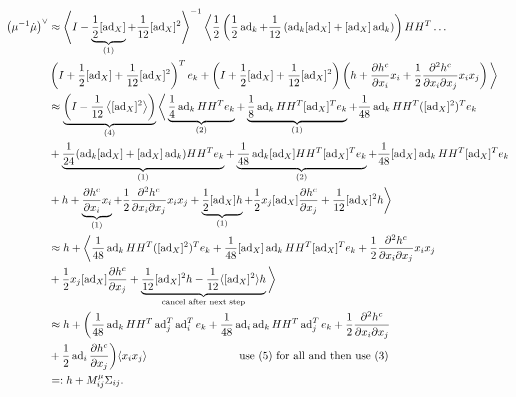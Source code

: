 \documentclass[12pt,class=article,crop=false]{standalone}
\begin{document}
\begin{align*}
	\left(\mu^{-1} \dot{\mu} \right)^\vee &\approx \left\langle I - \underbrace{\frac{1}{2} [\operatorname{ad}_X]}_{(1)} + \frac{1}{12} [\operatorname{ad}_X]^2 \right\rangle^{-1} \bigg\langle \frac{1}{2} \left( \frac{1}{2} \operatorname{ad}_{ k} + \frac{1}{12} \left( \operatorname{ad}_{ k} [ \operatorname{ad}_{ X}] + [ \operatorname{ad}_{ X}] \operatorname{ad}_{ k} \right)\right) HH^{T} \ldots \\
					      &\left( I + \frac{1}{2}[\operatorname{ad}_X] + \frac{1}{12}[\operatorname{ad}_X]^2 \right)^{T} e_k + \left( I + \frac{1}{2}[\operatorname{ad}_X] + \frac{1}{12}[\operatorname{ad}_X]^2 \right) \left( h + \frac{\partial h^{c}}{\partial x_i} x_i + \frac{1}{2} \frac{\partial^2 h^{c}}{\partial { x_i} \partial x_j} x_i x_j   \right)    \bigg\rangle \\
					      &\approx \underbrace{ \left( I - \frac{1}{12} \left\langle [\operatorname{ad}_X]^2 \right\rangle  \right)}_{(4) }  \bigg\langle \underbrace{\frac{1}{4} \operatorname{ad}_{ k}HH^{T} e_k}_{(2)} + \underbrace{ \frac{1}{8} \operatorname{ad}_{ k} HH^{T} [ \operatorname{ad}_{ X}]^{T} e_k}_{ (1)} + \frac{1}{48} \operatorname{ad}_{ k} HH^{T} ([ \operatorname{ad}_{ X}]^2)^{T} e_k\\ 
					      &+ \underbrace{ \frac{1}{24} (\operatorname{ad}_{ k} [ \operatorname{ad}_{ X}] + [ \operatorname{ad}_{ X}] \operatorname{ad}_{ k})HH^{T} e_k}_{ (1)} + \underbrace{ \frac{1}{48} \operatorname{ad}_{ k} [ \operatorname{ad}_{ X}] HH^{T}[ \operatorname{ad}_{ X}]^{T} e_k}_{ (2)} + \frac{1}{48} [ \operatorname{ad}_{ X}] \operatorname{ad}_{ k} HH^{T} [ \operatorname{ad}_{ X}]^{T} e_k  \\
					      &+ h+ \underbrace{\frac{\partial h^{c}}{\partial x_i} x_i }_{(1)}+ \frac{1}{2} \frac{\partial^2 h^{c}}{\partial { x_i} \partial x_j} x_i x_j + \underbrace{ \frac{1}{2} [ \operatorname{ad}_{ X}] h}_{ (1)} + \frac{1}{2} x_j [ \operatorname{ad}_{ X}] \frac{\partial h^{c}}{\partial x_j} + \frac{1}{12} [ \operatorname{ad}_{ X}]^2 h  \bigg\rangle \\
					      &\approx h + \bigg\langle  \frac{1}{48} \operatorname{ad}_{ k} HH^{T} ([ \operatorname{ad}_{ X}]^2)^{T} e_k + \frac{1}{48} [ \operatorname{ad}_{ X}] \operatorname{ad}_{ k} HH^{T} [ \operatorname{ad}_{ X}]^{T} e_k +  \frac{1}{2} \frac{\partial^2 h^{c}}{\partial { x_i} \partial x_j} x_i x_j \\ 
					      &+ \frac{1}{2} x_j [ \operatorname{ad}_{ X}] \frac{\partial h^{c}}{\partial x_j} + \underbrace{ \frac{1}{12} [ \operatorname{ad}_{ X}]^2 h - \frac{1}{12} \langle [ \operatorname{ad}_{ X}]^2 \rangle h }_{ \text{cancel after next step} }  \bigg\rangle  \\
					      &\approx   h + \bigg(  \frac{1}{48} \operatorname{ad}_{ k} HH^{T}\operatorname{ad}_{ j}^{T} \operatorname{ad}_{ i}^{T} e_k + \frac{1}{48} \operatorname{ad}_{ i} \operatorname{ad}_{ k} HH^{T} \operatorname{ad}_{ j}^{T} e_k +  \frac{1}{2} \frac{\partial^2 h^{c}}{\partial { x_i} \partial x_j} \\ 
					      &+ \frac{1}{2} \operatorname{ad}_{ i} \frac{\partial h^{c}}{\partial x_j} \bigg) \langle x_i x_j\rangle \qquad \qquad \qquad \qquad    \text{ use (5) for all and then use (3)}   \\
					      &=: h + M^{\mu}_{ij} \Sigma_{ij}  .
 \\
\end{align*}
\end{document}
